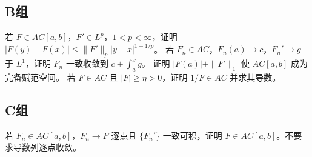 \subsection*{B组}
\begin{enumerate}[label=\textbf{\thechapter.\arabic*.},resume]
若 \(F\in AC[a,b]\)，\(F'\in L^p\)，\(1<p<\infty\)，证明
\(|F(y)-F(x)|\le\|F'\|_p|y-x|^{1-1/p}\)。
若 \(F_n\in AC\)，\(F_n(a)\to c\)，\(F_n'\to g\) 于 \(L^1\)，证明 \(F_n\) 一致收敛到 \(c+\int_a^xg\)。
证明 \(|F(a)|+\|F'\|_1\) 使 \(AC[a,b]\) 成为完备赋范空间。
若 \(F\in AC\) 且 \(|F|\ge\eta>0\)，证明 \(1/F\in AC\) 并求其导数。
\end{enumerate}
\subsection*{C组}
\begin{enumerate}[label=\textbf{\thechapter.\arabic*.},resume]
若 \(F_n\in AC[a,b]\)，\(F_n\to F\) 逐点且 \(\{F_n'\}\) 一致可积，证明 \(F\in AC[a,b]\)。不要求导数列逐点收敛。
\end{enumerate}
